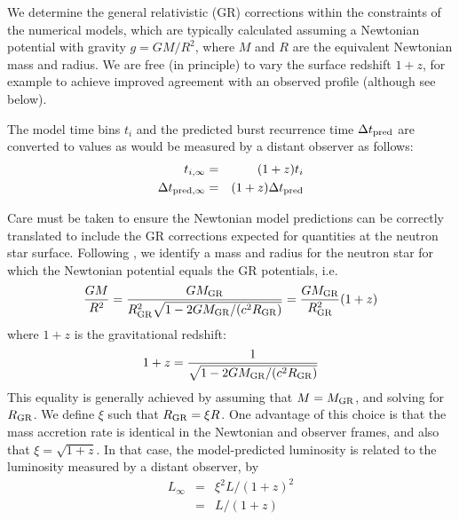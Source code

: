 \documentclass{aastex61}
\begin{document}
We determine the general relativistic (GR) corrections within the constraints of the numerical models, which are typically calculated assuming a Newtonian potential with gravity $g=GM/R^2$, where $M$ and $R$ are the equivalent Newtonian mass and radius.
%
We are free (in principle) to vary the surface redshift $1+z$, for example to achieve improved agreement with an observed profile (although see below). 

The model time bins  $t_i$ and the predicted burst recurrence time $\Delta t_{\rm pred}$ are converted to values as would be measured by a distant observer as follows:
\begin{eqnarray}
t_{i,\infty} & = & (1+z)t_i \\
\Delta t_{{\rm pred},\infty} & = & (1+z)\Delta t_{\rm pred}
\end{eqnarray}

Care must be taken to ensure the Newtonian model predictions can be correctly translated to include the GR corrections expected for quantities at the neutron star surface.
%
Following \cite{lampe16}, 
we identify a mass and radius for the neutron star for which the Newtonian potential equals the GR potentials, i.e.
\begin{equation}
\frac{GM}{R^2} = \frac{GM_{\rm GR}}{R^2_{\rm GR}\sqrt{1-2GM_{\rm GR}/(c^2R_{\rm GR})}} = \frac{GM_{\rm GR}}{R^2_{\rm GR}}(1+z)
\end{equation}
where $1+z$ is the gravitational redshift:
\begin{equation}
1+z = \frac{1}{\sqrt{1-2GM_{\rm GR}/(c^2R_{\rm GR})}}
\end{equation}
This equality is generally achieved by assuming that $M=M_{\rm GR}$, and solving for $R_{\rm GR}$. 
We define $\xi$ such that $R_{\rm GR}=\xi R$. 
One advantage of this choice is that the mass accretion rate is identical in the Newtonian and observer frames, and also that $\xi = \sqrt{1 + z}$. In that case, the model-predicted luminosity is related to the luminosity measured by a distant observer, by 
\begin{eqnarray}
L_\infty & = & \xi^2L/(1+z)^2 \nonumber \\
& = & L/(1+z)
\end{eqnarray}
\end{document}
